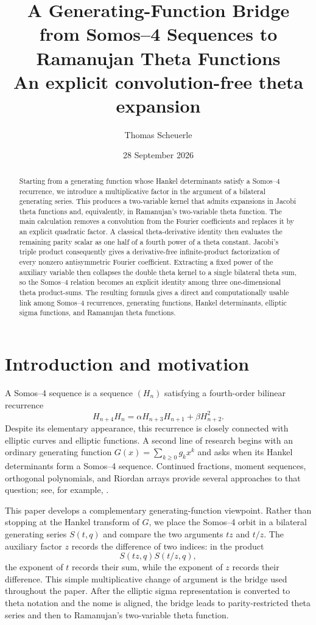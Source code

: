 \documentclass[11pt]{article}
\title{A Generating-Function Bridge from Somos--4 Sequences to Ramanujan Theta Functions\\\large An explicit convolution-free theta expansion}
\author{Thomas Scheuerle}
\date{28 September 2026}
\numberwithin{equation}{section}
\begin{document}
\maketitle

\begin{abstract}
Starting from a generating function whose Hankel determinants satisfy a Somos--4 recurrence, we introduce a multiplicative factor in the argument of a bilateral generating series.  This produces a two-variable kernel that admits expansions in Jacobi theta functions and, equivalently, in Ramanujan's two-variable theta function.  The main calculation removes a convolution from the Fourier coefficients and replaces it by an explicit quadratic factor.  A classical theta-derivative identity then evaluates the remaining parity scalar as one half of a fourth power of a theta constant.  Jacobi's triple product consequently gives a derivative-free infinite-product factorization of every nonzero antisymmetric Fourier coefficient.  Extracting a fixed power of the auxiliary variable then collapses the double theta kernel to a single bilateral theta sum, so the Somos--4 relation becomes an explicit identity among three one-dimensional theta product-sums.  The resulting formula gives a direct and computationally usable link among Somos--4 recurrences, generating functions, Hankel determinants, elliptic sigma functions, and Ramanujan theta functions.
\end{abstract}

\section{Introduction and motivation}
A Somos--4 sequence is a sequence $(H_n)$ satisfying a fourth-order bilinear recurrence
\begin{equation}
H_{n+4}H_n=\alpha H_{n+3}H_{n+1}+\beta H_{n+2}^2.
\end{equation}
Despite its elementary appearance, this recurrence is closely connected with elliptic curves and elliptic functions.  A second line of research begins with an ordinary generating function $G(x)=\sum_{k\ge0}g_kx^k$ and asks when its Hankel determinants form a Somos--4 sequence.  Continued fractions, moment sequences, orthogonal polynomials, and Riordan arrays provide several approaches to that question; see, for example, \cite{Barry2018,Barry2019,LiuWangZhang2026,Scheuerle2026}.

This paper develops a complementary generating-function viewpoint.  Rather than stopping at the Hankel transform of $G$, we place the Somos--4 orbit in a bilateral generating series $S(t,q)$ and compare the two arguments $tz$ and $t/z$.  The auxiliary factor $z$ records the difference of two indices: in the product
\begin{equation}
S(tz,q)S(t/z,q),
\end{equation}
the exponent of $t$ records their sum, while the exponent of $z$ records their difference.  This simple multiplicative change of argument is the bridge used throughout the paper.  After the elliptic sigma representation is converted to theta notation and the nome is aligned, the bridge leads to parity-restricted theta series and then to Ramanujan's two-variable theta function.
\end{document}
